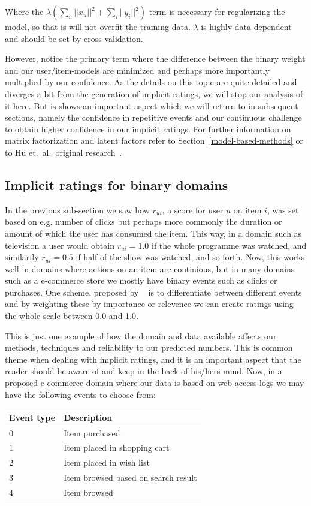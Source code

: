 Where the $\lambda (\sum _{u} || x_u ||^2 + \sum_{i} || y_i ||^2)$ term is
necessary for regularizing the model, so that is will not overfit the
training data. $\lambda$ is highly data dependent and should be set by
cross-validation.

However, notice the primary term where the difference between the binary weight
and our user/item-models are minimized and perhaps more importantly multiplied
by our confidence. As the details on this topic are quite detailed and diverges
a bit from the generation of implicit ratings, we will stop our analysis of it
here. But is shows an important aspect which we will return to in subsequent
sections, namely the confidence in repetitive events and our continuous
challenge to obtain higher confidence in our implicit ratings. For further
information on matrix factorization and latent factors refer to
Section~\ref{model-based-methods} or to Hu et.\ al.\ original
research~\cite{Hu2008}.

\subsection{Implicit ratings for binary domains}
\label{implicit-binary-domains}

In the previous sub-section we saw how $r_{ui}$, a score for user $u$ on item
$i$, was set based on e.g. number of clicks but perhaps more commonly the
duration or amount of which the user has consumed the item. This way, in a
domain such as television a user would obtain $r_{ui} = 1.0$ if the whole
programme was watched, and similarily $r_{ui} = 0.5$ if half of the show was
watched, and so forth. Now, this works well in domains where actions on an item
are continious, but in many domains such as a e-commerce store we mostly have
binary events such as clicks or purchases. One scheme, proposed by
~\cite{pkghost2014implicit} is to differentiate between different events and by
weighting these by importance or relevence we can create ratings using the
whole scale between 0.0 and 1.0.

This is just one example of how the domain and data available affects our
methods, techniques and reliability to our predicted numbers. This is common
theme when dealing with implicit ratings, and it is an important aspect that
the reader should be aware of and keep in the back of his/hers mind. Now, in a
proposed e-commerce domain where our data is based on web-access logs we may
have the following events to choose from:

\begin{table}[H]
  \centering
  \begin{tabular}{ll}
  \toprule
  Event type & Description \\ \midrule
  0 & Item purchased \\
  1 & Item placed in shopping cart \\
  2 & Item placed in wish list \\
  3 & Item browsed based on search result \\
  4 & Item browsed \\
  \bottomrule
  \end{tabular}
\end{table}

